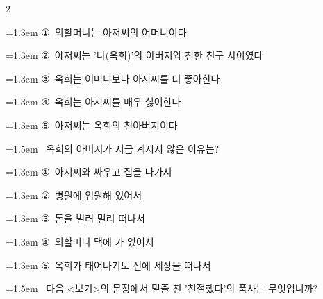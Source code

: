 \documentclass[11pt, a4paper]{article}
\begin{document}
\begin{multicols}{2}
\begin{minipage}{\columnwidth}
\vspace{0.5mm}
{\hangindent=1.3em  \noindent\hspace{0.3em}①~외할머니는 아저씨의 어머니이다\par}
{\hangindent=1.3em  \noindent\hspace{0.3em}②~아저씨는 '나(옥희)'의 아버지와 친한 친구 사이였다\par}
{\hangindent=1.3em  \noindent\hspace{0.3em}③~옥희는 어머니보다 아저씨를 더 좋아한다\par}
{\hangindent=1.3em  \noindent\hspace{0.3em}④~옥희는 아저씨를 매우 싫어한다\par}
{\hangindent=1.3em  \noindent\hspace{0.3em}⑤~아저씨는 옥희의 친아버지이다\par}
\vspace{4mm}
\end{minipage}
\par

\noindent\begin{minipage}{\columnwidth}
\vspace{2mm}
{\hangindent=1.5em  ~옥희의 아버지가 지금 계시지 않은 이유는?\par}

\vspace{0.5mm}
{\hangindent=1.3em  \noindent\hspace{0.3em}①~아저씨와 싸우고 집을 나가서\par}
{\hangindent=1.3em  \noindent\hspace{0.3em}②~병원에 입원해 있어서\par}
{\hangindent=1.3em  \noindent\hspace{0.3em}③~돈을 벌러 멀리 떠나서\par}
{\hangindent=1.3em  \noindent\hspace{0.3em}④~외할머니 댁에 가 있어서\par}
{\hangindent=1.3em  \noindent\hspace{0.3em}⑤~옥희가 태어나기도 전에 세상을 떠나서\par}
\vspace{4mm}
\end{minipage}
\par

\noindent\begin{minipage}{\columnwidth}
\vspace{2mm}
{\hangindent=1.5em  ~다음 <보기>의 문장에서 밑줄 친 '친절했다'의 품사는 무엇입니까?\par}


\end{minipage}
\end{multicols}
\end{document}
